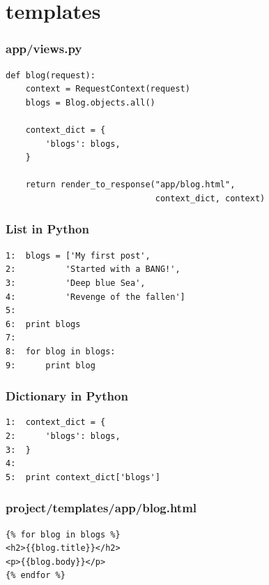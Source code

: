 \documentclass[bigger, presentation]{beamer}
\begin{document}
\section{templates}
\label{sec-3}
\begin{frame}[fragile]
\frametitle{app/views.py}
\label{sec-3-1}



\begin{verbatim}
def blog(request):
    context = RequestContext(request)
    blogs = Blog.objects.all()

    context_dict = {
        'blogs': blogs,
    }

    return render_to_response("app/blog.html",
                              context_dict, context)
\end{verbatim}
\end{frame}
\begin{frame}[fragile]
\frametitle{List in Python}
\label{sec-3-2}

   

\begin{verbatim}
1:  blogs = ['My first post',
2:          'Started with a BANG!',
3:          'Deep blue Sea',
4:          'Revenge of the fallen']
5:  
6:  print blogs
7:  
8:  for blog in blogs:
9:      print blog
\end{verbatim}
   
\end{frame}
\begin{frame}[fragile]
\frametitle{Dictionary in Python}
\label{sec-3-3}

   

\begin{verbatim}
1:  context_dict = {
2:      'blogs': blogs,
3:  }
4:  
5:  print context_dict['blogs']
\end{verbatim}
\end{frame}
\begin{frame}[fragile]
\frametitle{project/templates/app/blog.html}
\label{sec-3-4}



\begin{verbatim}
{% for blog in blogs %}
<h2>{{blog.title}}</h2>
<p>{{blog.body}}</p>
{% endfor %}
\end{verbatim}

   
\end{frame}
\end{document}
